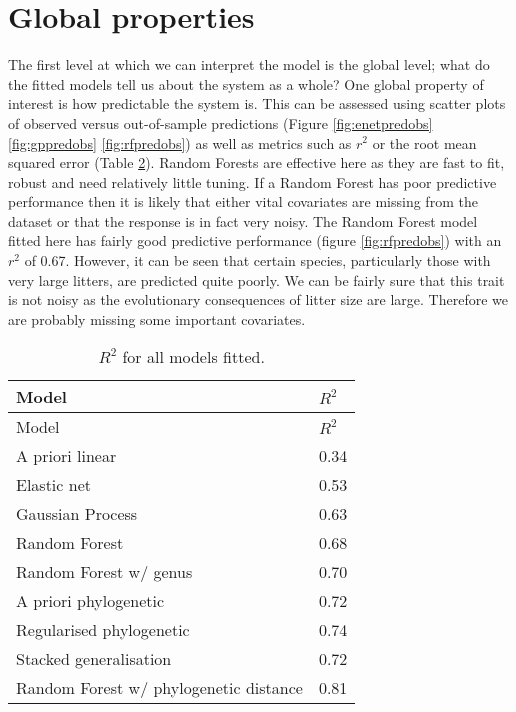 \documentclass[10pt,]{article}
\begin{document}
\section{Global properties}\label{global-properties}

The first level at which we can interpret the model is the global level; what do the fitted models tell us about the system as a whole?
One global property of interest is how predictable the system is.
This can be assessed using scatter plots of observed versus out-of-sample predictions (Figure \ref{fig:enetpredobs} \ref{fig:gppredobs} \ref{fig:rfpredobs}) as well as metrics such as \(r^2\) or the root mean squared error (Table \ref{tbl:allr2}).
Random Forests are effective here as they are fast to fit, robust and need relatively little tuning.
If a Random Forest has poor predictive performance then it is likely that either vital covariates are missing from the dataset or that the response is in fact very noisy.
The Random Forest model fitted here has fairly good predictive performance (figure \ref{fig:rfpredobs}) with an \(r^2\) of 0.67.
However, it can be seen that certain species, particularly those with very large litters, are predicted quite poorly.
We can be fairly sure that this trait is not noisy as the evolutionary consequences of litter size are large.
Therefore we are probably missing some important covariates.

\begin{table}[t!]
\begin{longtable}[c]{@{}ll@{}}
\caption{\(R^2\) for all models fitted. \label{tbl:allr2}}\tabularnewline
\toprule
Model & \(R^2\)\tabularnewline
\midrule
\endfirsthead
\toprule
Model & \(R^2\)\tabularnewline
\midrule
\endhead
A priori linear & 0.34\tabularnewline
Elastic net & 0.53\tabularnewline
Gaussian Process & 0.63\tabularnewline
Random Forest & 0.68\tabularnewline
Random Forest w/ genus & 0.70\tabularnewline
A priori phylogenetic & 0.72\tabularnewline
Regularised phylogenetic & 0.74\tabularnewline
Stacked generalisation & 0.72\tabularnewline
Random Forest w/ phylogenetic distance & 0.81\tabularnewline
\bottomrule
\end{longtable}
\end{table}
\end{document}

